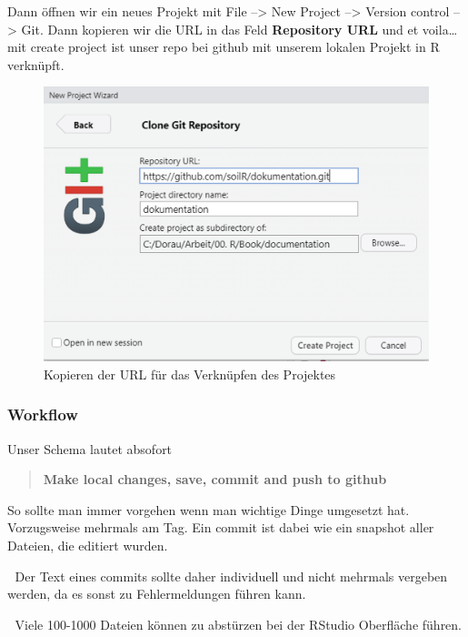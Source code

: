 \documentclass[
]{article}
\begin{document}
Dann öffnen wir ein neues Projekt mit File --\textgreater{} New Project --\textgreater{} Version control --\textgreater{} Git. Dann kopieren wir die URL in das Feld \textbf{Repository URL} und et voila\ldots mit create project ist unser repo bei github mit unserem lokalen Projekt in R verknüpft.

\begin{figure}

{\centering \includegraphics[width=1\linewidth]{images/069} 

}

\caption{Kopieren der URL für das Verknüpfen des Projektes}\label{fig:unnamed-chunk-302}
\end{figure}

\hypertarget{workflow}{%
\subsubsection{Workflow}\label{workflow}}

Unser Schema lautet absofort

\begin{quote}
\textbf{Make local changes, save, commit and push to github}
\end{quote}

So sollte man immer vorgehen wenn man wichtige Dinge umgesetzt hat. Vorzugsweise mehrmals am Tag. Ein commit ist dabei wie ein snapshot aller Dateien, die editiert wurden.

🚨 Der Text eines commits sollte daher individuell und nicht mehrmals vergeben werden, da es sonst zu Fehlermeldungen führen kann.

🚨 Viele 100-1000 Dateien können zu abstürzen bei der RStudio Oberfläche führen.
\end{document}
